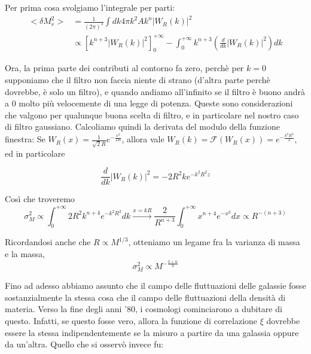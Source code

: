 \documentclass{report}
\begin{document}
Per prima cosa svolgiamo l'integrale per parti: 
\begin{align}
    <\delta M_r^2> &= \frac{1}{(2\pi)^3}\int dk4\pi k^2 Ak^n|W_R(k)|^2 \\
    &\propto \left[k^{n+3}|W_R(k)|^2\right]_0^{+\infty} - \int_0^{+\infty}k^{n+3}\left( \frac{d}{dk}|W_R(k)|^2\right) dk
\end{align}

Ora, la prima parte dei contributi al contorno fa zero, perchè per $k=0$ supponiamo che il filtro non faccia niente di strano (d'altra parte perchè dovrebbe, è solo un filtro), e quando andiamo all'infinito se il filtro è buono andrà a $0$ molto più velocemente di una legge di potenza. Queste sono considerazioni che valgono per qualunque buona scelta di filtro, e in particolare nel nostro caso di filtro gaussiano. Calcoliamo quindi la derivata del modulo della funzione finestra: Se $W_R(x) = \frac{1}{\sqrt{2}R}e^{-\frac{x^2}{2R}}$, allora vale $W_R(k) = \mathcal{F}(W_R(x)) = e^{-\frac{k^2R^2}{2}}$, ed in particolare 

\begin{equation}
    \frac{d}{dk}|W_R(k)|^2 = -2R^2ke^{-k^2R^2z}
\end{equation}

Così che troveremo
\begin{equation}
    \sigma_M^2 \propto \int_0^{+\infty} 2R^2k^{n+4}e^{-k^2R^2}dk \xrightarrow{x = kR} \frac{2}{R^{n+3}}\int_0^{+\infty}x^{n+4}e^{-x^2}dx \propto R^{-(n+3)} 
\end{equation}

Ricordandosi anche che $R \propto M^{1/3}$, otteniamo un legame fra la varianza di massa e la massa, 
\begin{equation}
    \sigma_M^2 \propto  M^{-\frac{3+n}{3}}
\end{equation}


Fino ad adesso abbiamo assunto che il campo delle fluttuazioni delle galassie fosse sostanzialmente la stessa cosa che il campo delle fluttuazioni della densità di materia. Verso la fine degli anni '80, i cosmologi cominciarono a dubitare di questo. Infatti, se questo fosse vero, allora la funzione di correlazione $\xi$ dovrebbe essere la stessa indipendentemente se la misuro a partire da una galassia oppure da un'altra. Quello che si osservò invece fu: 
\end{document}
